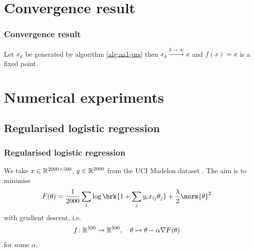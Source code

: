 \section{Convergence result}

\begin{frame}
	\frametitle{Convergence result}
	\begin{theorem}[Convergence]
		Let $x_k$ be generated by algorithm \ref{alg:aa1-prs} then $x_k\xrightarrow{k\to\infty}x$ and $f(x)=x$ is a fixed point.
	\end{theorem}
\end{frame}

%	 

\begin{frame}
	\centering
	
\end{frame}


\section{Numerical experiments}

\subsection{Regularised logistic regression}

\begin{frame}
	\frametitle{Regularised logistic regression}
	We take $x\in\mathbb{R}^{2000\times 500}$, $y\in\mathbb{R}^{2000}$ from the UCI Madelon dataset \cite{MadDat}. The aim is to minimise
	\begin{align*}
		F(\theta) = \frac{1}{2000}\sum_{i}\log\brk{1+\sum_jy_ix_{ij}\theta_j}+\frac{\lambda}{2}\norm{\theta}^2
	\end{align*}
	with gradient descent, i.e.\
	\begin{align*}
		f\colon \mathbb{R}^{500}\to\mathbb{R}^{500}, \quad \theta\mapsto\theta-\alpha\nabla F(\theta)
	\end{align*}
	for some $\alpha$.
\end{frame}

